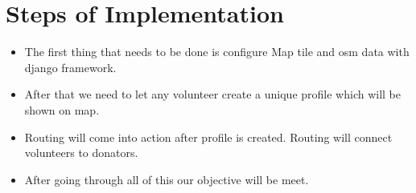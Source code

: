 \section{Steps of Implementation}
\begin{itemize}
	\item The first thing that needs to be done is configure Map tile and osm data with django framework. 
	\item After that we need to let any volunteer create a unique profile which will be shown on map.
	\item Routing will come into action after profile is created. Routing will connect volunteers to donators.
	\item After going through all of this our objective will be meet.
\end{itemize}
